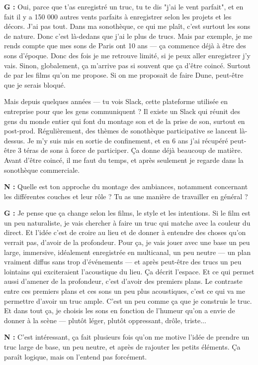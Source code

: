 ﻿\documentclass[12pt]{article}
\begin{document}
\textbf{G :} Oui, parce que t'as enregistré un truc, tu te dis "j'ai le vent parfait", et en fait il y a 150 000 autres vents parfaits à enregistrer selon les projets et les décors. J'ai pas tout. Dans ma sonothèque, ce qui me plaît, c'est surtout les sons de nature. Donc c'est là-dedans que j'ai le plus de trucs. Mais par exemple, je me rends compte que mes sons de Paris ont 10 ans — ça commence déjà à être des sons d'époque. Donc des fois je me retrouve limité, si je peux aller enregistrer j'y vais. Sinon, globalement, ça m'arrive pas si souvent que ça d'être coincé. Surtout de par les films qu'on me propose. Si on me proposait de faire Dune, peut-être que je serais bloqué. 

Mais depuis quelques années — tu vois Slack, cette plateforme utilisée en entreprise pour que les gens communiquent ? Il existe un Slack qui réunit des gens du monde entier qui font du montage son et de la prise de son, surtout en post-prod. Régulièrement, des thèmes de sonothèque participative se lancent là-dessus. Je m'y suis mis en sortie de confinement, et en 6 ans j'ai récupéré peut-être 3 téras de sons à force de participer. Ça donne déjà beaucoup de matière. Avant d'être coincé, il me faut du temps, et après seulement je regarde dans la sonothèque commerciale. 

\textbf{N :} Quelle est ton approche du montage des ambiances, notamment concernant les différentes couches et leur rôle ? Tu as une manière de travailler en général ? 

\textbf{G :} Je pense que ça change selon les films, le style et les intentions. Si le film est un peu naturaliste, je vais chercher à faire un truc qui matche avec la couleur du direct. Et l'idée c'est de croire au lieu et de donner à entendre des choses qu'on verrait pas, d'avoir de la profondeur. Pour ça, je vais jouer avec une base un peu large, immersive, idéalement enregistrée en multicanal, un peu neutre — un plan vraiment diffus sans trop d'événements — et après peut-être des trucs un peu lointains qui exciteraient l'acoustique du lieu. Ça décrit l'espace. Et ce qui permet aussi d'amener de la profondeur, c'est d'avoir des premiers plans. Le contraste entre ces premiers plans et ces sons un peu plus acoustiques, c'est ce qui va me permettre d'avoir un truc ample. C'est un peu comme ça que je construis le truc. Et dans tout ça, je choisis les sons en fonction de l'humeur qu'on a envie de donner à la scène — plutôt léger, plutôt oppressant, drôle, triste... 

\textbf{N :} C'est intéressant, ça fait plusieurs fois qu'on me motive l'idée de prendre un truc large de base, un peu neutre, et après de rajouter les petits éléments. Ça paraît logique, mais on l'entend pas forcément. 
\end{document}
